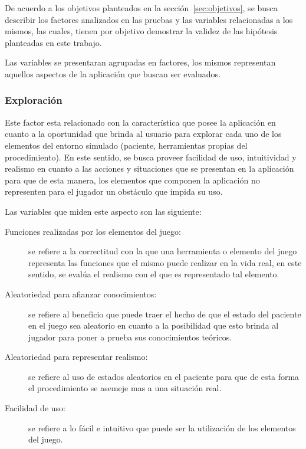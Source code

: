 De acuerdo a los objetivos planteados en la sección~\ref{sec:objetivos}, se
busca describir los factores analizados en las pruebas y las variables
relacionadas a los mismos, las cuales, tienen por objetivo demostrar la validez
de las hipótesis planteadas en este trabajo.

Las variables se presentaran agrupadas en factores, los mismos representan
aquellos aspectos de la aplicación que buscan ser evaluados.

\subsubsection{Exploración}

Este factor esta relacionado con la característica que posee la aplicación en
cuanto a la oportunidad que brinda al usuario para explorar cada uno de los
elementos del entorno simulado (paciente, herramientas propias del
procedimiento). En este sentido, se busca proveer facilidad de uso, intuitividad
y realismo en cuanto a las acciones y situaciones que se presentan en la
aplicación para que de esta manera, los elementos que componen la aplicación no
representen para el jugador un obstáculo que impida su uso.

Las variables que miden este aspecto son las siguiente:

\begin{description}

\item [Funciones realizadas por los elementos del juego:] se refiere a la
    correctitud con la que una herramienta o elemento del juego representa las
    funciones que el mismo puede realizar en la vida real, en este sentido, se
    evalúa el realismo con el que es representado tal elemento.

\item [Aleatoriedad para afianzar conocimientos:] se refiere al beneficio que
    puede traer el hecho de que el estado del paciente en el juego sea aleatorio
    en cuanto a la posibilidad que esto brinda al jugador para poner a prueba
    sus conocimientos teóricos.

\item [Aleatoriedad para representar realismo:] se refiere al uso de estados
    aleatorios en el paciente para que de esta forma el procedimiento se asemeje
    mas a una situación real.

\item [Facilidad de uso:] se refiere a lo fácil e intuitivo  que puede ser la
    utilización de los elementos del juego.

\end{description}

